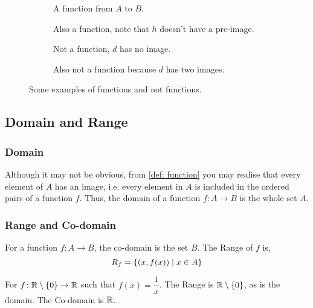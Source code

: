\begin{figure}[H]
    \begin{subfigure}{.5\textwidth}
        \centering
        \caption{A function from \(A\) to \(B\).}
    \end{subfigure}%
    \begin{subfigure}{.5\textwidth}
        \centering
        \caption{Also a function, note that \(h\) doesn't have a pre-image.}
    \end{subfigure}
    \begin{subfigure}{.5\textwidth}
        \centering
        \caption{Not a function, \(d\) has no image.}
    \end{subfigure}
    \begin{subfigure}{.5\textwidth}
        \centering
        \caption{Also not a function because \(d\) has two images.}
    \end{subfigure}
    \caption{Some examples of functions and not functions.}
\end{figure}

\subsection{Domain and Range}

\subsubsection{Domain}

Although it may not be obvious, from \cref{def: function} you may realise that every element
of \(A\) has an image, i.e. every element in \(A\) is included in the ordered pairs of a function
\(f\). Thus, the domain of a function \(f : A \to B\) is the whole set \(A\).

\subsubsection{Range and Co-domain}

For a function \(f : A \rightarrow B\), the co-domain is the set \(B\). 
The Range of \(f\) is, 
\[R_f = \left\{(x, f(x)) \mid x \in A\right\}\]

\begin{example}
    For \(f \colon \mathbb R \setminus \left\{0\right\} \to \mathbb R\) such that \(f(x)=\dfrac{1}{x}\). The Range
    is \(\mathbb R \setminus \left\{0\right\}\), as is the domain. The Co-domain is \(\mathbb R\).
\end{example}


